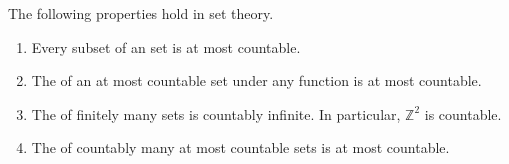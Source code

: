 \begin{proposition} \label{proposition:basic_properties_of_countability}
    The following properties hold in  set theory.

    \begin{enumerate}
        \item Every subset of an  set is at most countable.
        \item The  of an at most countable set under any function is at most countable.
        \item The  of finitely many  sets is countably infinite. In particular, $\mathbb{Z}^2$ is countable.
        \item The  of countably many at most countable sets is at most countable.
    \end{enumerate}
\end{proposition}

